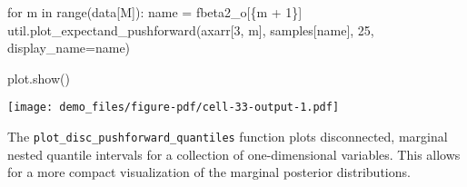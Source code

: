 \documentclass[
  letterpaper,
  DIV=11,
  numbers=noendperiod]{scrartcl}
\newenvironment{Shaded}{\begin{snugshade}}{\end{snugshade}}
\newcommand{\BuiltInTok}[1]{\textcolor[rgb]{0.00,0.23,0.31}{#1}}
\newcommand{\ControlFlowTok}[1]{\textcolor[rgb]{0.00,0.23,0.31}{#1}}
\newcommand{\DecValTok}[1]{\textcolor[rgb]{0.68,0.00,0.00}{#1}}
\newcommand{\KeywordTok}[1]{\textcolor[rgb]{0.00,0.23,0.31}{#1}}
\newcommand{\NormalTok}[1]{\textcolor[rgb]{0.00,0.23,0.31}{#1}}
\newcommand{\OperatorTok}[1]{\textcolor[rgb]{0.37,0.37,0.37}{#1}}
\newcommand{\SpecialCharTok}[1]{\textcolor[rgb]{0.37,0.37,0.37}{#1}}
\newcommand{\SpecialStringTok}[1]{\textcolor[rgb]{0.13,0.47,0.30}{#1}}
\newcommand{\StringTok}[1]{\textcolor[rgb]{0.13,0.47,0.30}{#1}}
\begin{document}
\begin{Shaded}
\begin{Highlighting}[]
\ControlFlowTok{for}\NormalTok{ m }\KeywordTok{in} \BuiltInTok{range}\NormalTok{(data[}\StringTok{\textquotesingle{}M\textquotesingle{}}\NormalTok{]):}
\NormalTok{  name }\OperatorTok{=} \SpecialStringTok{f\textquotesingle{}beta2\_o[}\SpecialCharTok{\{}\NormalTok{m }\OperatorTok{+} \DecValTok{1}\SpecialCharTok{\}}\SpecialStringTok{]\textquotesingle{}}
\NormalTok{  util.plot\_expectand\_pushforward(axarr[}\DecValTok{3}\NormalTok{, m], samples[name],}
                                  \DecValTok{25}\NormalTok{, display\_name}\OperatorTok{=}\NormalTok{name)}

\NormalTok{plot.show()}
\end{Highlighting}
\end{Shaded}

\texttt{[image: demo\_files/figure-pdf/cell-33-output-1.pdf]}

The \texttt{plot\_disc\_pushforward\_quantiles} function plots
disconnected, marginal nested quantile intervals for a collection of
one-dimensional variables. This allows for a more compact visualization
of the marginal posterior distributions.
\end{document}
